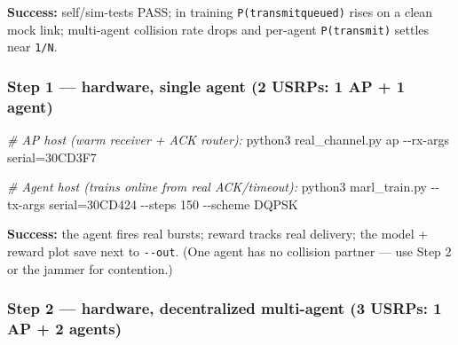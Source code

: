 \documentclass[
  9.5pt,
]{article}
\newenvironment{Shaded}{\begin{snugshade}}{\end{snugshade}}
\newcommand{\AttributeTok}[1]{\textcolor[rgb]{0.77,0.63,0.00}{#1}}
\newcommand{\CommentTok}[1]{\textcolor[rgb]{0.56,0.35,0.01}{\textit{#1}}}
\newcommand{\ExtensionTok}[1]{#1}
\newcommand{\NormalTok}[1]{#1}
\begin{document}
\textbf{Success:} self/sim-tests PASS; in training
\texttt{P(transmit\textbar{}queued)} rises on a clean mock link;
multi-agent collision rate drops and per-agent \texttt{P(transmit)}
settles near \texttt{1/N}.

\hypertarget{step-1--hardware-single-agent-2-usrps-1-ap--1-agent}{%
\subsubsection{Step 1 --- hardware, single agent (2 USRPs: 1 AP + 1
agent)}\label{step-1--hardware-single-agent-2-usrps-1-ap--1-agent}}

\begin{Shaded}
\begin{Highlighting}[]
\CommentTok{\# AP host (warm receiver + ACK router):}
\ExtensionTok{python3}\NormalTok{ real\_channel.py ap }\AttributeTok{{-}{-}rx{-}args}\NormalTok{ serial=30CD3F7}

\CommentTok{\# Agent host (trains online from real ACK/timeout):}
\ExtensionTok{python3}\NormalTok{ marl\_train.py }\AttributeTok{{-}{-}tx{-}args}\NormalTok{ serial=30CD424 }\AttributeTok{{-}{-}steps}\NormalTok{ 150 }\AttributeTok{{-}{-}scheme}\NormalTok{ DQPSK}
\end{Highlighting}
\end{Shaded}

\textbf{Success:} the agent fires real bursts; reward tracks real
delivery; the model + reward plot save next to \texttt{-\/-out}. (One
agent has no collision partner --- use Step 2 or the jammer for
contention.)

\hypertarget{step-2--hardware-decentralized-multi-agent-3-usrps-1-ap--2-agents}{%
\subsubsection{Step 2 --- hardware, decentralized multi-agent (3 USRPs:
1 AP + 2
agents)}\label{step-2--hardware-decentralized-multi-agent-3-usrps-1-ap--2-agents}}
\end{document}
